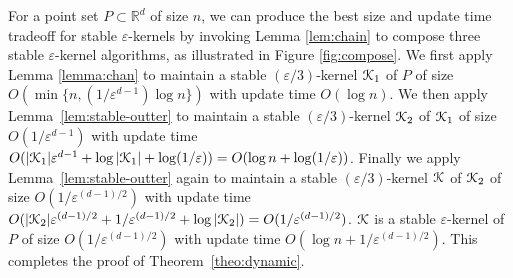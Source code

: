 \documentclass[11pt]{myclass}
\newcommand{\eps}{\varepsilon}
\renewcommand{\b}[1]{\ensuremath{\mathbb{#1}}}
\def\kernel{\EuScript{K}}
\begin{document}
For a point set $P \subset \b{R}^d$ of size $n$, we can produce the 
best size and update time tradeoff for stable $\eps$-kernels by 
invoking Lemma \ref{lem:chain} to compose three stable $\eps$-kernel 
algorithms, as illustrated in Figure \ref{fig:compose}.  
We first apply Lemma \ref{lemma:chan} to maintain a stable 
$(\eps/3)$-kernel $\kernel_1$ of $P$ of size $O(\min\{n, (1/\eps^{d-1}) \log n\})$ 
with update time $O(\log n)$.  
We then apply Lemma~\ref{lem:stable-outter} to maintain a stable 
$(\eps/3)$-kernel $\kernel_2$ of $\kernel_1$ of size $O(1/\eps^{d-1})$ 
with update time $O(|\kernel_1| \eps^{d-1} + \log |\kernel_1| + \log (1/\eps)) 
= O(\log n + \log (1/\eps))$.  
Finally we apply Lemma~\ref{lem:stable-outter} again to maintain a 
stable $(\eps/3)$-kernel $\kernel$ of $\kernel_2$ of size 
$O(1/\eps^{(d-1)/2})$ with update time 
$O(|\kernel_2| \eps^{(d-1)/2} + 1/\eps^{(d-1)/2} + \log |\kernel_2|) 
= O(1/\eps^{(d-1)/2})$.  
$\kernel$ is a stable $\eps$-kernel of $P$ of size
$O(1/\eps^{(d-1)/2})$ with update time $O(\log n +
1/\eps^{(d-1)/2})$.  This completes the proof of
Theorem~\ref{theo:dynamic}.
\end{document}
